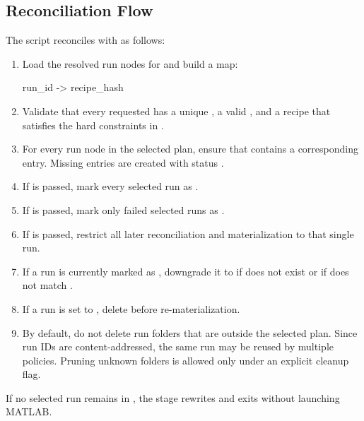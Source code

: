 \documentclass[11pt]{article}
\begin{document}
\subsection*{Reconciliation Flow}

The script reconciles  with  as follows:

\begin{enumerate}
\item Load the resolved run nodes for  and build a map:
\begin{DocCode}
run_id -> recipe_hash
\end{DocCode}
\item Validate that every requested  has a unique , a valid , and a recipe that satisfies the hard constraints in .
\item For every run node in the selected plan, ensure that  contains a corresponding entry. Missing entries are created with status .
\item If  is passed, mark every selected run as .
\item If  is passed, mark only failed selected runs as .
\item If  is passed, restrict all later reconciliation and materialization to that single run.
\item If a run is currently marked as , downgrade it to  if  does not exist or if  does not match .
\item If a run is set to , delete  before re-materialization.
\item By default, do not delete run folders that are outside the selected plan. Since run IDs are content-addressed, the same run may be reused by multiple policies. Pruning unknown folders is allowed only under an explicit cleanup flag.
\end{enumerate}

If no selected run remains in , the stage rewrites  and exits without launching MATLAB.
\end{document}
